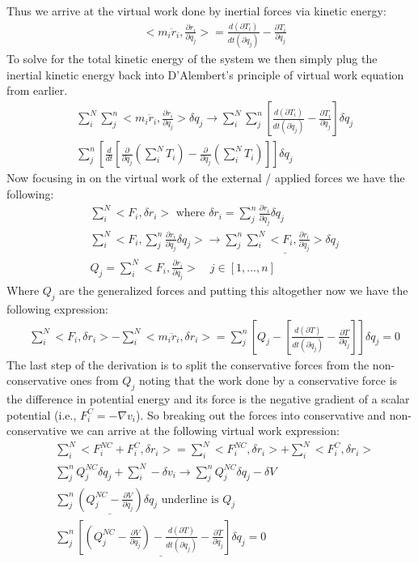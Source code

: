 \documentclass{article}
\begin{document}
Thus we arrive at the virtual work done by inertial forces via kinetic energy:
\begin{align*}
    & <m_i \ddot{r}_i, \frac{\partial r_i}{\partial q_j}> = \frac{d(\partial T_i)}{dt(\partial \dot{q}_j)} - \frac{\partial T_i}{\partial q_j}
\end{align*}
To solve for the total kinetic energy of the system we then simply plug the inertial kinetic energy back into D'Alembert's principle of virtual work equation from earlier.
\begin{align*}
    & \sum_i^N \sum_j^n <m_i \ddot{r}_i, \frac{\partial r_i}{\partial q_j}> \delta q_j \to \sum_i^N \sum_j^n[\frac{d(\partial T_i)}{dt(\partial \dot{q}_j)} - \frac{\partial T_i}{\partial q_j}] \delta q_j \\
    & \sum_j^n [\frac{d}{dt}[\frac{\partial}{\partial \dot{q}_j}(\sum_i^N T_i) - \frac{\partial}{\partial q_j}(\sum_i^N T_i)]]\delta q_j
\end{align*}
Now focusing in on the virtual work of the external / applied forces we have the following:
\begin{align*}
    & \sum_i^N <F_i, \delta r_i> \text{ where } \delta r_i = \sum_j^n \frac{\partial r_i}{\partial q_j}\delta q_j \\
    & \sum_i^N <F_i, \sum_j^n \frac{\partial r_i}{\partial q_j} \delta q_j> \to \sum_j^n \underline{\sum_i^N <F_i, \frac{\partial r_i}{\partial q_j}>} \delta q_j \\
    & Q_j = \sum_i^N <F_i, \frac{\partial r_i}{\partial q_j}> \quad j \in [1, ..., n]
\end{align*}
Where $Q_j$ are the generalized forces and putting this altogether now we have the following expression:
\begin{align*}
    & \sum_i^N <F_i, \delta r_i> - \sum_i^N <m_i \ddot{r}_i, \delta r_i> = \sum_j^n[Q_j - [\frac{d(\partial T)}{dt(\partial \dot{q}_j)} - \frac{\partial T}{\partial q_j}]] \delta q_j = 0
\end{align*}
The last step of the derivation is to split the conservative forces from the non-conservative ones from $Q_j$ noting that the work done by a conservative force is the difference in potential energy and its force is the negative gradient of a scalar potential (i.e., $F_i^C = -\nabla v_i$). So breaking out the forces into conservative and non-conservative we can arrive at the following virtual work expression:
\begin{align*}
    & \sum_i^N <F_i^{NC} + F_i^C, \delta r_i> = \sum_i^N <F_i^{NC}, \delta r_i> + \sum_i^N <F_i^C, \delta r_i> \\
    & \sum_j^n Q_j^{NC} \delta q_j + \sum_i^N - \delta v_i \to \sum_j^n Q_j^{NC} \delta q_j - \delta V \\
    & \sum_j^n \underline{(Q_j^{NC} - \frac{\partial V}{\partial q_j})} \delta q_j \text{ underline is } Q_j \\
    & \underline{\sum_j^n[(Q_j^{NC} - \frac{\partial V}{\partial q_j}) - \frac{d(\partial T)}{dt(\partial \dot{q}_j)} - \frac{\partial T}{\partial q_j}] \delta q_j = 0}
\end{align*}
\end{document}
